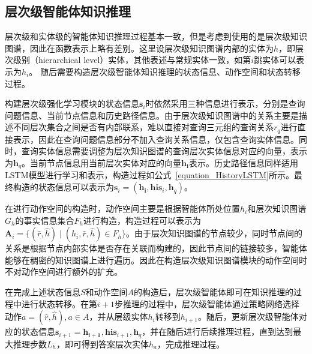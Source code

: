 \documentclass[algorithmlist, AutoFakeBold, AutoFakeSlant, figurelist, tablelist, nomlist, masters]{seuthesix}
\begin{document}
\subsection{层次级智能体知识推理}
层次级和实体级的智能体知识推理过程基本一致，但是考虑到使用的是层次级知识图谱，因此在函数表示上略有差别。这里设层次级知识图谱内部的实体为$h$，即层次级别（hierarchical level）实体，其他表述与常规实体一致，如第$i$跳实体可以表示为$h_i$。
随后需要构造层次级智能体知识推理的状态信息、动作空间和状态转移过程。

构建层次级强化学习模块的状态信息$\bm{s}_i$时依然采用三种信息进行表示，分别是查询问题信息、当前节点信息和历史路径信息。由于层次级知识图谱中的关系主要是描述不同层次集合之间是否有内部联系，难以直接对查询三元组的查询关系$r_q$进行直接表示，因此在查询问题信息部分不加入查询关系信息，仅包含查询实体信息。同时，查询实体信息需要调整为层次知识图谱的查询层次实体信息对应的向量，表示为$\bm{h}_q$。当前节点信息用当前层次实体对应的向量$\bm{h_i}$表示。历史路径信息同样适用LSTM模型进行学习和表示，构造过程如公式~\ref{equation_HistoryLSTM}所示。最终构造的状态信息可以表示为$\bm{s}_i = (\bm{h_i}, \bm{his}_i, \bm{h}_q)$。

在进行动作空间的构造时，动作空间主要是根据智能体所处位置$h_i$和层次知识图谱$G_h$的事实信息集合$F_h$进行构造，构造过程可以表示为$\bm{A}_i = \{(\hat{r}, \hat{h}) \mid (h_i, \hat{r}, \hat{h}) \in F_h\}$。由于层次知识图谱的节点较少，同时节点间的关系是根据节点内部实体是否存在关联而构建的，因此节点间的链接较多，智能体能够在稠密的知识图谱上进行遍历。因此在构造层次级知识图谱模块的动作空间时不对动作空间进行额外的扩充。

在完成上述状态信息$S$和动作空间$A$的构造后，层次级智能体即可在知识推理的过程中进行状态转移。在第$i+1$步推理的过程中，层次级智能体通过策略网络选择动作$a = (\hat{r}, \hat{h}), a \in A$，并从层级实体$h_i$转移到$h_{i+1}$。随后，更新层次级智能体对应的状态信息$\bm{s}_{i+1} = {\bm{h_{i+1}}, \bm{his}_{i+1}, \bm{h}_q}$，并在随后进行后续推理过程，直到达到最大推理步数$L_h$，即可得到答案层次实体$h_a$，完成推理过程。
\end{document}
